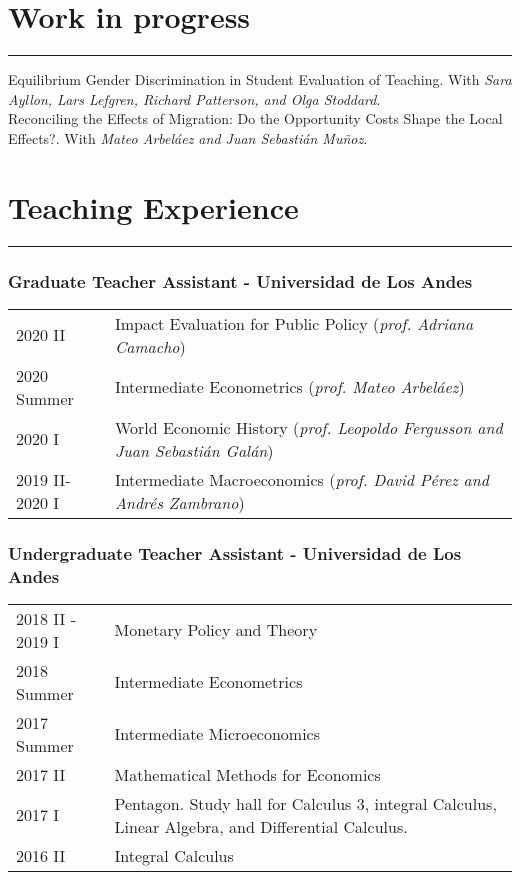 \documentclass[12pt, letterpaper]{article}
\begin{document}
\vspace{-5mm}

\section*{Work in progress}
\vspace*{-8mm}
\noindent \rule{\linewidth}{0.2mm}
\noindent Equilibrium Gender Discrimination in Student Evaluation of Teaching. With \textit{Sara Ayllon, Lars Lefgren, Richard Patterson, and Olga Stoddard}. \\ [-3mm]

\noindent Reconciling the Effects of Migration: Do the Opportunity Costs Shape the Local Effects?. With \textit{Mateo Arbeláez and Juan Sebastián Muñoz}. \\ [-3mm]

\vspace{-7mm}

\section*{Teaching Experience}
\vspace*{-8mm}
\noindent \rule{\linewidth}{0.2mm}
\vspace*{-12mm}
\subsubsection*{Graduate Teacher Assistant - Universidad de Los Andes}
\vspace*{-2mm}
\noindent
\begin{tabular}{@{}p{3cm}p{13.7cm}}
2020 II & Impact Evaluation for Public Policy (\textit{prof. Adriana Camacho}) \\
2020 Summer & Intermediate Econometrics (\textit{prof. Mateo Arbeláez}) \\
2020 I & World Economic History (\small{\textit{prof. Leopoldo Fergusson and Juan Sebastián Galán}}) \\
2019 II-2020 I & Intermediate Macroeconomics (\textit{prof. David Pérez and Andrés Zambrano}) 
\end{tabular}
\vspace*{-4mm}
\subsubsection*{Undergraduate Teacher Assistant - Universidad de Los Andes}
\vspace*{-2mm}
\noindent
\begin{tabular}{@{}p{3cm}p{13.7cm}}
2018 II - 2019 I    &       Monetary Policy and Theory \\
2018 Summer         &       Intermediate Econometrics \\
2017 Summer         &       Intermediate Microeconomics \\
2017 II             &       Mathematical Methods for Economics \\ 
2017 I              &       Pentagon. Study hall for Calculus 3, integral Calculus, Linear Algebra, and Differential Calculus. \\
2016 II             &       Integral Calculus 
\end{tabular}
\end{document}

